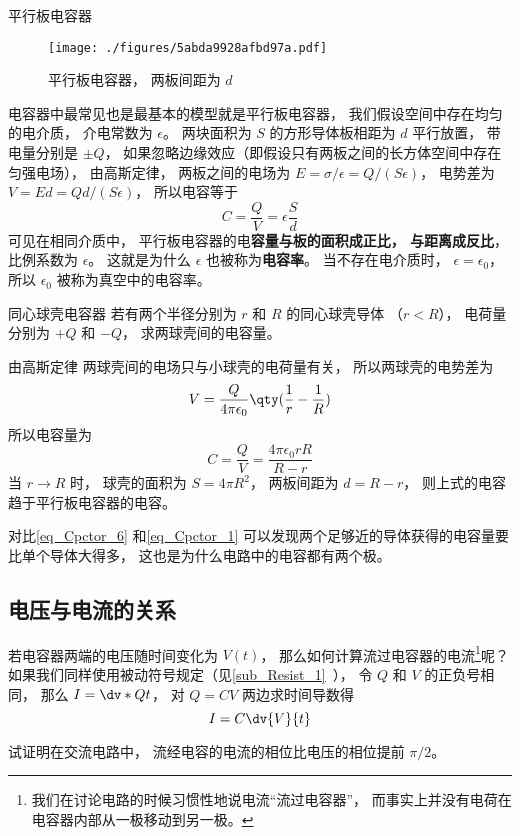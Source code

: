 \begin{example}{平行板电容器}\label{ex_Cpctor_2}
\begin{figure}[ht]
\centering
\texttt{[image: ./figures/5abda9928afbd97a.pdf]}
\caption{平行板电容器， 两板间距为 $d$} \label{fig_Cpctor_1}
\end{figure}
电容器中最常见也是最基本的模型就是平行板电容器， 我们假设空间中存在均匀的电介质， 介电常数为 $\epsilon$。 两块面积为 $S$ 的方形导体板相距为 $d$ 平行放置， 带电量分别是 $\pm Q$， 如果忽略边缘效应（即假设只有两板之间的长方体空间中存在匀强电场）， 由高斯定律，%
两板之间的电场为 $E = {\sigma}/{\epsilon} = Q/(S\epsilon)$， 电势差为 $V = Ed = Qd/(S\epsilon)$， 所以电容等于
\begin{equation}\label{eq_Cpctor_4}
C = \frac{Q}{V} = \epsilon \frac Sd
\end{equation}
可见在相同介质中， 平行板电容器的电\textbf{容量与板的面积成正比， 与距离成反比}， 比例系数为 $\epsilon$。 这就是为什么 $\epsilon$ 也被称为\textbf{电容率}。 当不存在电介质时， $\epsilon = \epsilon_0$， 所以 $\epsilon_0$ 被称为真空中的电容率。
\end{example}

\begin{example}{同心球壳电容器}
若有两个半径分别为 $r$ 和 $R$ 的同心球壳导体 （$r < R$）， 电荷量分别为 $+Q$ 和 $-Q$， 求两球壳间的电容量。

由高斯定律%
两球壳间的电场只与小球壳的电荷量有关， 所以两球壳的电势差为
\begin{equation}
V = \frac{Q}{4\pi\epsilon_0} \qty(\frac 1r - \frac 1R)
\end{equation}
所以电容量为
\begin{equation}\label{eq_Cpctor_6}
C = \frac QV = \frac{4\pi\epsilon_0 rR}{R - r}
\end{equation}
当 $r\to R$ 时， 球壳的面积为 $S = 4\pi R^2$， 两板间距为 $d = R - r$， 则上式的电容趋于平行板电容器的电容。
\end{example}

对比\autoref{eq_Cpctor_6} 和\autoref{eq_Cpctor_1} 可以发现两个足够近的导体获得的电容量要比单个导体大得多， 这也是为什么电路中的电容都有两个极。

\subsection{电压与电流的关系}
若电容器两端的电压随时间变化为 $V(t)$， 那么如何计算流过电容器的电流\footnote{我们在讨论电路的时候习惯性地说电流“流过电容器”， 而事实上并没有电荷在电容器内部从一极移动到另一极。}呢？ 如果我们同样使用被动符号规定（见\autoref{sub_Resist_1}~）， 令 $Q$ 和 $V$ 的正负号相同， 那么 $I = \dv*{Q}{t}$， 对 $Q = CV$ 两边求时间导数得
\begin{equation}\label{eq_Cpctor_3}
I = C\dv{V}{t}
\end{equation}
\begin{exercise}{}
试证明在交流电路中， 流经电容的电流的相位比电压的相位提前 $\pi/2$。
\end{exercise}

